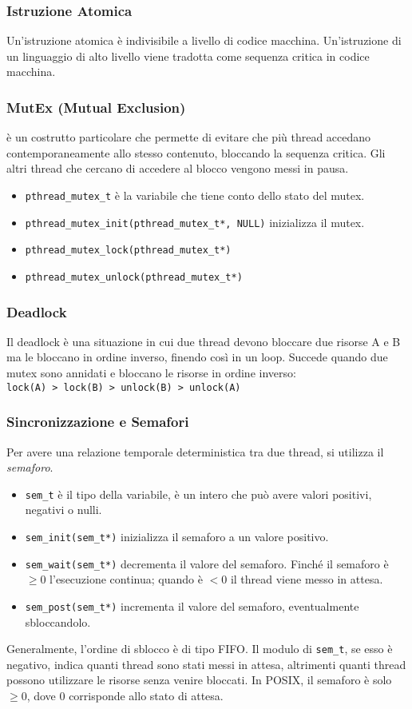 \documentclass[10pt,a4paper]{article}
\newcommand{\code}{\texttt}
\begin{document}
\subsubsection{Istruzione Atomica}
Un'istruzione atomica è indivisibile a livello di codice macchina. Un'istruzione di un linguaggio di alto livello viene tradotta come sequenza critica in codice macchina.

\subsubsection{MutEx (Mutual Exclusion)}
è un costrutto particolare che permette di evitare che pi\`u thread accedano contemporaneamente allo stesso contenuto, bloccando la sequenza critica. Gli altri thread che cercano di accedere al blocco vengono messi in pausa.
\begin{itemize}
    \item \code{pthread\_mutex\_t} è la variabile che tiene conto dello stato del mutex.
    \item \code{pthread\_mutex\_init(pthread\_mutex\_t*, NULL)} inizializza il mutex.
    \item \code{pthread\_mutex\_lock(pthread\_mutex\_t*)}
    \item \code{pthread\_mutex\_unlock(pthread\_mutex\_t*)}
\end{itemize}

\subsubsection{Deadlock}
Il deadlock è una situazione in cui due thread devono bloccare due risorse A e B ma le bloccano in ordine inverso, finendo cos\`i in un loop. Succede quando due mutex sono annidati e bloccano le risorse in ordine inverso:\\
\code{lock(A) > lock(B) > unlock(B) > unlock(A)}

\subsubsection{Sincronizzazione e Semafori}
Per avere una relazione temporale deterministica tra due thread, si utilizza il \emph{semaforo}.
\begin{itemize}
    \item \code{sem\_t} è il tipo della variabile, è un intero che può avere valori positivi, negativi o nulli.
    \item \code{sem\_init(sem\_t*)} inizializza il semaforo a un valore positivo.
    \item \code{sem\_wait(sem\_t*)} decrementa il valore del semaforo. Finché il semaforo è $\geq 0$ l'esecuzione continua; quando è $< 0$ il thread viene messo in attesa.
    \item \code{sem\_post(sem\_t*)} incrementa il valore del semaforo, eventualmente sbloccandolo.
\end{itemize}
Generalmente, l'ordine di sblocco è di tipo FIFO. Il modulo di \code{sem\_t}, se esso è negativo, indica quanti thread sono stati messi in attesa, altrimenti quanti thread possono utilizzare le risorse senza venire bloccati. In POSIX, il semaforo è solo $\geq 0$, dove 0 corrisponde allo stato di attesa.
\end{document}
